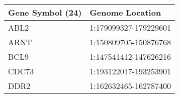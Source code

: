 \begin{tabular}{ll}
\toprule
Gene Symbol (24) &       Genome Location \\
\midrule
            ABL2 & 1:179099327-179229601 \\
            ARNT & 1:150809705-150876768 \\
            BCL9 & 1:147541412-147626216 \\
           CDC73 & 1:193122017-193253901 \\
            DDR2 & 1:162632465-162787400 \\
\bottomrule
\end{tabular}
